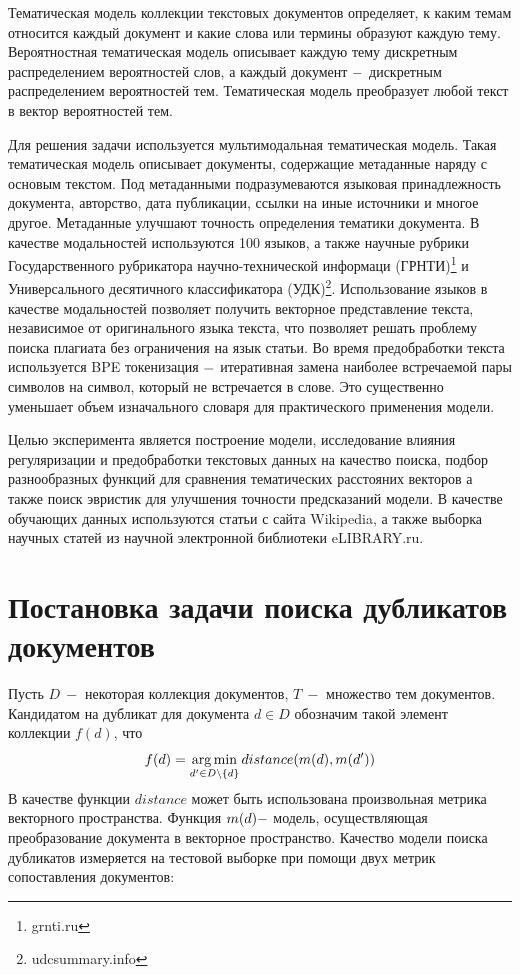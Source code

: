 \documentclass[12pt, twoside]{article}
\begin{document}
Тематическая модель коллекции текстовых документов определяет, к каким темам относится каждый документ и какие слова или термины образуют каждую тему. Вероятностная тематическая модель описывает каждую тему дискретным распределением вероятностей слов, а каждый документ $\--$ дискретным распределением вероятностей тем. Тематическая модель преобразует любой текст в вектор вероятностей тем. 

Для решения задачи используется мультимодальная тематическая модель. Такая тематическая модель описывает документы, содержащие метаданные наряду с основым текстом. Под метаданными подразумеваются языковая принадлежность документа, авторство, дата публикации, ссылки на иные источники и многое другое. Метаданные улучшают точность определения тематики документа. В качестве модальностей используются 100 языков, а также научные рубрики Государственного рубрикатора научно-технической информаци (ГРНТИ)\footnote{grnti.ru} и Универсального десятичного классификатора (УДК)\footnote{udcsummary.info}. Использование языков в качестве модальностей позволяет получить векторное представление текста, независимое от оригинального языка текста, что позволяет решать проблему поиска плагиата без ограничения на язык статьи. Во время предобработки текста используется BPE токенизация $\--$ итеративная замена наиболее встречаемой пары символов на символ, который не встречается в слове. Это существенно уменьшает объем изначального словаря для практического применения модели.

Целью эксперимента является построение модели, исследование влияния регуляризации и предобработки текстовых данных на качество поиска, подбор разнообразных функций для сравнения тематических расстояних векторов а также поиск эвристик для улучшения точности предсказаний модели. В качестве обучающих данных используются статьи с сайта Wikipedia, а также выборка научных статей из научной электронной библиотеки eLIBRARY.ru.

\section{Постановка задачи поиска дубликатов документов}

Пусть $D~-$ некоторая коллекция документов, $T~-$ множество тем документов. Кандидатом на дубликат  для документа $d \in D$ обозначим такой элемент коллекции $f(d)$, что  $$f(d) = \argmin_{d' \in D \setminus \{d\}} distance(m(d), m(d'))$$ 
В качестве функции $distance$ может быть использована произвольная метрика векторного пространства. Функция  $m(d) \--$ модель, осуществляющая преобразование документа в векторное пространство. Качество модели поиска дубликатов измеряется на тестовой выборке при помощи двух метрик сопоставления документов:
\end{document}
